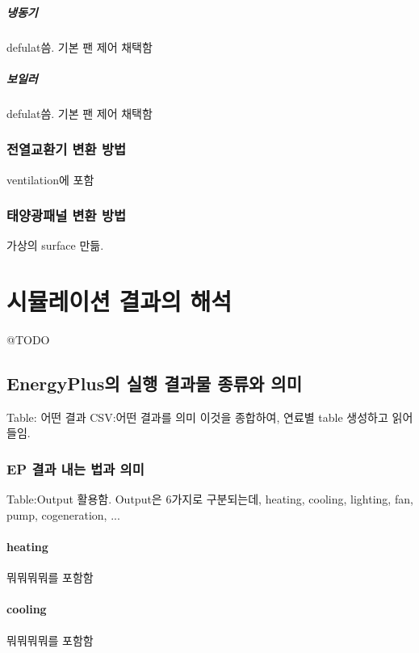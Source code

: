 \paragraph{냉동기} defulat씀. 기본 팬 제어 채택함
\paragraph{보일러} defulat씀. 기본 팬 제어 채택함

\subsection{전열교환기 변환 방법}
ventilation에 포함

\subsection{태양광패널 변환 방법}
가상의 surface 만듦.


\chapter{시뮬레이션 결과의 해석} @TODO

\section{EnergyPlus의 실행 결과물 종류와 의미}
Table: 어떤 결과 
CSV:어떤 결과를 의미
이것을 종합하여, 연료별 table 생성하고 읽어들임.

\subsection{EP 결과 내는 법과 의미}
Table:Output 활용함. Output은 6가지로 구분되는데, heating, cooling, lighting, fan, pump, cogeneration, ...

\subsubsection{heating}
뭐뭐뭐뭐를 포함함

\subsubsection{cooling}
뭐뭐뭐뭐를 포함함

